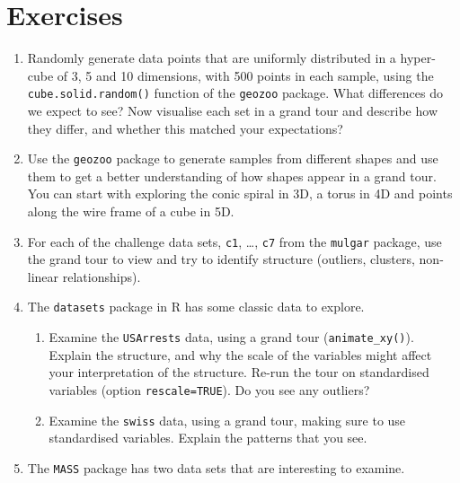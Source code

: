 \documentclass[
  letterpaper,
]{krantz}
\providecommand{\tightlist}{%
  \setlength{\itemsep}{0pt}\setlength{\parskip}{0pt}}
\begin{document}
  
  
   

\section*{Exercises}\label{exercises}


\begin{enumerate}
\def\labelenumi{\arabic{enumi}.}
\tightlist
\item
  Randomly generate data points that are uniformly distributed in a
  hyper-cube of 3, 5 and 10 dimensions, with 500 points in each sample,
  using the \texttt{cube.solid.random()} function of the \texttt{geozoo}
  package. What differences do we expect to see? Now visualise each set
  in a grand tour and describe how they differ, and whether this matched
  your expectations?
\item
  Use the \texttt{geozoo} package to generate samples from different
  shapes and use them to get a better understanding of how shapes appear
  in a grand tour. You can start with exploring the conic spiral in 3D,
  a torus in 4D and points along the wire frame of a cube in 5D.
\item
  For each of the challenge data sets, \texttt{c1}, \ldots, \texttt{c7}
  from the \texttt{mulgar} package, use the grand tour to view and try
  to identify structure (outliers, clusters, non-linear relationships).
\item
  The \texttt{datasets} package in R has some classic data to explore.

  \begin{enumerate}
  \def\labelenumii{\alph{enumii}.}
  \tightlist
  \item
    Examine the \texttt{USArrests} data, using a grand tour
    (\texttt{animate\_xy()}). Explain the structure, and why the scale
    of the variables might affect your interpretation of the structure.
    Re-run the tour on standardised variables (option
    \texttt{rescale=TRUE}). Do you see any outliers?
  \item
    Examine the \texttt{swiss} data, using a grand tour, making sure to
    use standardised variables. Explain the patterns that you see.
  \end{enumerate}
\item
  The \texttt{MASS} package has two data sets that are interesting to
  examine.


\end{enumerate}
\end{document}
